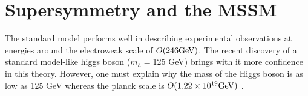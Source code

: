 \chapter{Supersymmetry and the MSSM}
The standard model performs well in describing experimental observations at energies around
the electroweak scale of $O(246 \mathrm{GeV})$.
The recent discovery of a standard model-like higgs boson ($m_{h}=$125 GeV) brings with it
more confidence in this theory. 
However, one must explain why the mass of the Higgs boson is as low as 125 GeV whereas
the planck scale is $O(1.22 \times10^{19} \mathrm{GeV})$
\cite{Martin:1997ns}.

